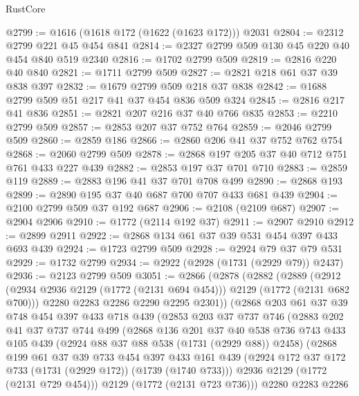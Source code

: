 \begin{lexlean}{RustCore}
\begin{coremodule}
@2799 := @1616 (@1618 @172 (@1622 (@1623 @172))) @2031
@2804 := @2312 @2799 @221 @45 @454 @841
@2814 := @2327 @2799 @509 @130 @45 @220 @40 @454 @840 @519 @2340
@2816 := @1702 @2799 @509
@2819 := @2816 @220 @40 @840
@2821 := @1711 @2799 @509
@2827 := @2821 @218 @61 @37 @39 @838 @397
@2832 := @1679 @2799 @509 @218 @37 @838
@2842 := @1688 @2799 @509 @51 @217 @41 @37 @454 @836 @509 @324
@2845 := @2816 @217 @41 @836
@2851 := @2821 @207 @216 @37 @40 @766 @835
@2853 := @2210 @2799 @509
@2857 := @2853 @207 @37 @752 @764
@2859 := @2046 @2799 @509
@2860 := @2859 @186
@2866 := @2860 @206 @41 @37 @752 @762 @754
@2868 := @2060 @2799 @509
@2878 := @2868 @197 @205 @37 @40 @712 @751 @761 @433 @227 @439
@2882 := @2853 @197 @37 @701 @710
@2883 := @2859 @119
@2889 := @2883 @196 @41 @37 @701 @708 @499
@2890 := @2868 @193
@2899 := @2890 @195 @37 @40 @687 @700 @707 @433 @681 @439
@2904 := @2100 @2799 @509 @37 @192 @687
@2906 := @2108 (@2109 @687)
@2907 := @2904 @2906
@2910 := @1772 (@2114 @192 @37)
@2911 := @2907 @2910
@2912 := @2899 @2911
@2922 := @2868 @134 @61 @37 @39 @531 @454 @397 @433 @693 @439
@2924 := @1723 @2799 @509
@2928 := @2924 @79 @37 @79 @531
@2929 := @1732 @2799
@2934 := @2922 (@2928 (@1731 (@2929 @79)) @2437)
@2936 := @2123 @2799 @509
@3051 := @2866
    (@2878
      (@2882
        (@2889
          (@2912 (@2934 @2936 @2129 (@1772 (@2131 @694 @454))) @2129 (@1772 (@2131 @682 @700)))
          @2280
          @2283
          @2286
          @2290
          @2295
          @2301))
      (@2868
        @203
        @61
        @37
        @39
        @748
        @454
        @397
        @433
        @718
        @439
        (@2853
          @203
          @37
          @737
          @746
          (@2883
            @202
            @41
            @37
            @737
            @744
            @499
            (@2868
              @136
              @201
              @37
              @40
              @538
              @736
              @743
              @433
              @105
              @439
              (@2924 @88 @37 @88 @538 (@1731 (@2929 @88)) @2458)
              (@2868
                @199
                @61
                @37
                @39
                @733
                @454
                @397
                @433
                @161
                @439
                (@2924 @172 @37 @172 @733 (@1731 (@2929 @172)) (@1739 (@1740 @733)))
                @2936
                @2129
                (@1772 (@2131 @729 @454)))
              @2129
              (@1772 (@2131 @723 @736)))
            @2280
            @2283
            @2286

\end{coremodule}
\end{lexlean}
